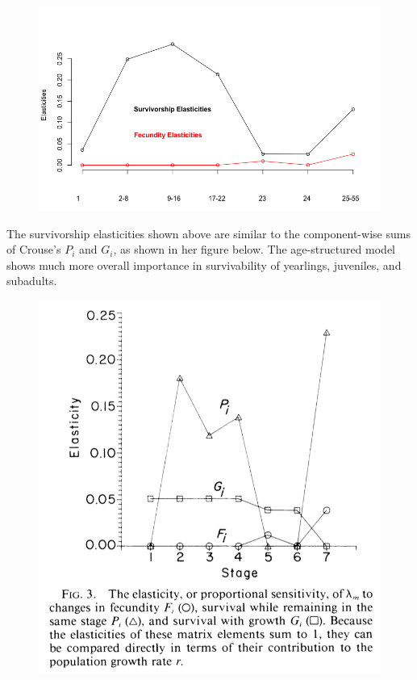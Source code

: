 \documentclass{article} %
\theoremstyle{plain}
\numberwithin{equation}{section} %
\numberwithin{figure}{section} %
\numberwithin{table}{section} %
\begin{document}
\begin{enumerate}[\ \ (a)]
        \begin{figure}[ht!]
            \centering
            \includegraphics[scale=0.5]{figure_1e.png}
        \end{figure}
        \FloatBarrier
        The survivorship elasticities shown above are similar to the component-wise sums of Crouse's $P_i$ and $G_i$, as shown in her figure below.  The age-structured model shows much more overall importance in survivability of yearlings, juveniles, and subadults.
        \begin{figure}[ht!]
            \centering
            \includegraphics[scale=0.6]{Crouse_et_al_fig_3.png}
        \end{figure}
\end{enumerate}
\end{document}
